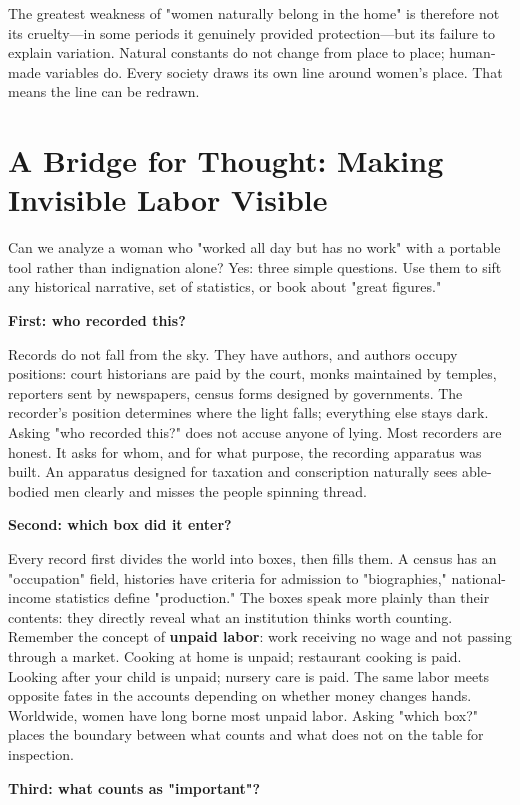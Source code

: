 The greatest weakness of "women naturally belong in the home" is therefore not its cruelty---in some periods it genuinely provided protection---but its failure to explain variation. Natural constants do not change from place to place; human-made variables do. Every society draws its own line around women's place. That means the line can be redrawn.

\section{A Bridge for Thought: Making Invisible Labor Visible}
Can we analyze a woman who "worked all day but has no work" with a portable tool rather than indignation alone? Yes: three simple questions. Use them to sift any historical narrative, set of statistics, or book about "great figures."

\textbf{First: who recorded this?}

Records do not fall from the sky. They have authors, and authors occupy positions: court historians are paid by the court, monks maintained by temples, reporters sent by newspapers, census forms designed by governments. The recorder's position determines where the light falls; everything else stays dark. Asking "who recorded this?" does not accuse anyone of lying. Most recorders are honest. It asks for whom, and for what purpose, the recording apparatus was built. An apparatus designed for taxation and conscription naturally sees able-bodied men clearly and misses the people spinning thread.

\textbf{Second: which box did it enter?}

Every record first divides the world into boxes, then fills them. A census has an "occupation" field, histories have criteria for admission to "biographies," national-income statistics define "production." The boxes speak more plainly than their contents: they directly reveal what an institution thinks worth counting. Remember the concept of \textbf{unpaid labor}: work receiving no wage and not passing through a market. Cooking at home is unpaid; restaurant cooking is paid. Looking after your child is unpaid; nursery care is paid. The same labor meets opposite fates in the accounts depending on whether money changes hands. Worldwide, women have long borne most unpaid labor. Asking "which box?" places the boundary between what counts and what does not on the table for inspection.

\textbf{Third: what counts as "important"?}


